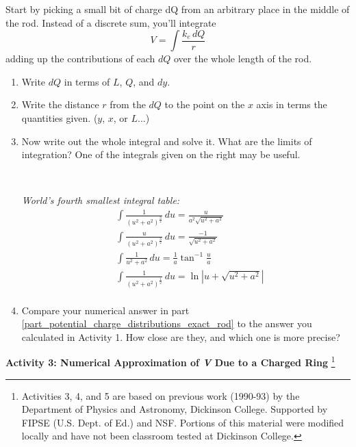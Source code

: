Start by picking a small bit of charge dQ from an arbitrary place in the middle of the rod.  Instead of a discrete sum, you'll integrate
$$V=\int{\frac{k_e\,dQ}{r}}$$
adding up the contributions of each $dQ$ over the whole length of the rod.
\begin{enumerate}[wide, label=(\emph{\alph*})]

\pagebreak[2]
\item Write $dQ$ in terms of $L$, $Q$, and $dy$.
\answerspace{0.3in}

\item Write the distance $r$ from the $dQ$ to the point on the $x$ axis in terms the quantities given.  ($y$, $x$, or $L$...) 
\answerspace{0.4in}

\item Now write out the whole integral and solve it.  What are the limits of integration?  One of the integrals given on the right may be useful. \label{part_potential_charge_distributions_exact_rod}

\begin{minipage}{0.65\textwidth}
\
\end{minipage}
\begin{minipage}{0.34\textwidth}

\textit{World's fourth smallest integral table:}
\begin{align*}
&\int \! \frac{1}{\left (u^2 + a^2 \right )^\frac{3}{2}} \, du=\frac{u}{a^2 \sqrt{u^2 + a^2}} \\
&\int \! \frac{u}{\left (u^2 + a^2 \right )^\frac{3}{2}} \, du=\frac{-1}{\sqrt{u^2 + a^2}} \\
&\int \! \frac{1}{u^2 + a^2} \, du=\frac{1}{a} \tan^{-1} \frac{u}{a} \\
&\int \! \frac{1}{\left (u^2 + a^2 \right )^\frac{1}{2}} \, du=\ln \left | u + \sqrt{u^2 + a^2} \right| \\
\end{align*}
\end{minipage}
\item Compare your numerical answer in part \ref{part_potential_charge_distributions_exact_rod} to the answer you calculated in Activity 1.  How close are they, and which one is more precise?
\answerspace{0.4in}

\end{enumerate}

\textbf{Activity 3: Numerical Approximation of \textit{V} Due to a Charged Ring}
\footnote{Activities 3, 4, and 5 are based on previous work (1990-93) by the Department of Physics and Astronomy, Dickinson College. Supported by FIPSE (U.S. Dept. of Ed.) and NSF. Portions of this material were modified locally and have not been classroom tested at Dickinson College.}

